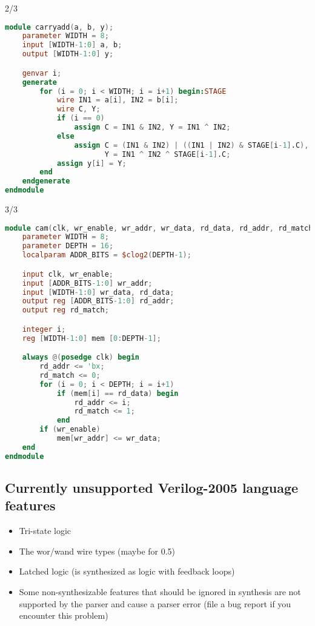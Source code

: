 \begin{frame}[fragile]{\subsecname{} 2/3}
\begin{lstlisting}[xleftmargin=1cm, basicstyle=\ttfamily\fontsize{8pt}{10pt}\selectfont, language=Verilog]
module carryadd(a, b, y);
    parameter WIDTH = 8;
    input [WIDTH-1:0] a, b;
    output [WIDTH-1:0] y;

    genvar i;
    generate
        for (i = 0; i < WIDTH; i = i+1) begin:STAGE
            wire IN1 = a[i], IN2 = b[i];
            wire C, Y;
            if (i == 0)
                assign C = IN1 & IN2, Y = IN1 ^ IN2;
            else
                assign C = (IN1 & IN2) | ((IN1 | IN2) & STAGE[i-1].C),
                       Y = IN1 ^ IN2 ^ STAGE[i-1].C;
            assign y[i] = Y;
        end
    endgenerate
endmodule
\end{lstlisting}
\end{frame}

\begin{frame}[fragile]{\subsecname{} 3/3}
\begin{lstlisting}[xleftmargin=1cm, basicstyle=\ttfamily\fontsize{7pt}{8.5pt}\selectfont, language=Verilog]
module cam(clk, wr_enable, wr_addr, wr_data, rd_data, rd_addr, rd_match);
    parameter WIDTH = 8;
    parameter DEPTH = 16;
    localparam ADDR_BITS = $clog2(DEPTH-1);

    input clk, wr_enable;
    input [ADDR_BITS-1:0] wr_addr;
    input [WIDTH-1:0] wr_data, rd_data;
    output reg [ADDR_BITS-1:0] rd_addr;
    output reg rd_match;

    integer i;
    reg [WIDTH-1:0] mem [0:DEPTH-1];

    always @(posedge clk) begin
        rd_addr <= 'bx;
        rd_match <= 0;
        for (i = 0; i < DEPTH; i = i+1)
            if (mem[i] == rd_data) begin
                rd_addr <= i;
                rd_match <= 1;
            end
        if (wr_enable)
            mem[wr_addr] <= wr_data;
    end
endmodule
\end{lstlisting}
\end{frame}


\subsection{Currently unsupported Verilog-2005 language features}

\begin{frame}{\subsecname}
\begin{itemize}
\item Tri-state logic
\item The wor/wand wire types (maybe for 0.5)
\item Latched logic (is synthesized as logic with feedback loops)
\item Some non-synthesizable features that should be ignored in synthesis are not supported by the parser and cause a parser error (file a bug report if you encounter this problem)
\end{itemize}
\end{frame}

